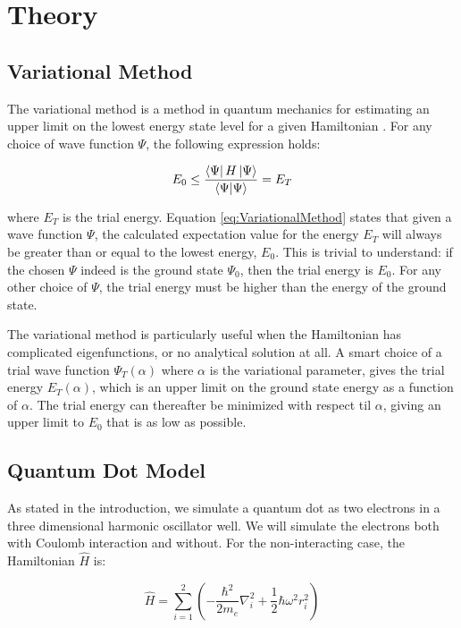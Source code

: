 \documentclass[norsk,a4paper,12pt]{article}
\begin{document}
\section{Theory} \label{Theory}

\subsection{Variational Method} \label{VariationalMethod}
The variational method is a method in quantum mechanics for estimating an upper limit on the lowest energy state level for a given Hamiltonian \cite{Griffiths}. For any choice of wave function $\Psi$, the following expression holds:

\begin{equation}
    E_0 \leq \frac{\bra{\Psi} H \ket{\Psi}}{\bra{\Psi}\ket{\Psi}} = E_T
    \label{eq:VariationalMethod}
\end{equation}

where $E_T$ is the trial energy. 
Equation \ref{eq:VariationalMethod} states that given a wave function $\Psi$, the calculated expectation value for the energy $E_T$ will always be greater than or equal to the lowest energy, $E_0$. This is trivial to understand: if the chosen $\Psi$ indeed is the ground state $\Psi_0$, then the trial energy is $E_0$. For any other choice of $\Psi$, the trial  energy must be higher than the energy of the ground state. \par 
The variational method is particularly useful when the Hamiltonian has complicated eigenfunctions, or no analytical solution at all. A smart choice of a trial wave function $\Psi_T(\alpha)$ where $\alpha$ is the variational parameter, gives the trial energy $E_T(\alpha)$, which is an upper limit on the ground state energy as a function of $\alpha$. The trial energy can thereafter be minimized with respect til $\alpha$, giving an upper limit to $E_0$ that is as low as possible.

\subsection{Quantum Dot Model}
As stated in the introduction, we simulate a quantum dot as two electrons in a three dimensional harmonic oscillator well. We will simulate the electrons both with Coulomb interaction and without. For the non-interacting case, the Hamiltonian $\hat{H}$ is:

\begin{equation}
    \hat{H} = \sum_{i=1}^{2} (-\frac{\hbar^2}{2 m_e}\nabla_i^2 + \frac{1}{2}\hbar \omega^2r_i^2) 
    \label{eq:H_non_interaction_unit}
\end{equation}
\end{document}
